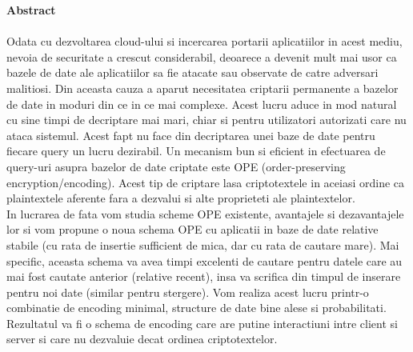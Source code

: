 \documentclass{article}
\newcommand\tab[1][1cm]{\hspace*{#1}}
\begin{document}
	\textbf{Abstract}\\\\
	\tab Odata cu dezvoltarea cloud-ului si incercarea portarii aplicatiilor in acest mediu, nevoia de securitate a crescut considerabil, deoarece a devenit mult mai usor ca bazele de date ale aplicatiilor sa fie atacate sau observate de catre adversari malitiosi. Din aceasta cauza a aparut necesitatea criptarii permanente a bazelor de date in moduri din ce in ce mai complexe. Acest lucru aduce in mod natural cu sine timpi de decriptare mai mari, chiar si pentru utilizatori autorizati care nu ataca sistemul. Acest fapt nu face din decriptarea unei baze de date pentru fiecare query un lucru dezirabil. Un mecanism bun si eficient in efectuarea de query-uri asupra bazelor de date criptate este OPE (order-preserving encryption/encoding). Acest tip de criptare lasa criptotextele in aceiasi ordine ca plaintextele aferente fara a dezvalui si alte proprieteti ale plaintextelor.\\
	\tab In lucrarea de fata vom studia scheme OPE existente, avantajele si dezavantajele lor si vom propune o noua schema OPE cu aplicatii in baze de date relative stabile (cu rata de insertie sufficient de mica, dar cu rata de cautare mare). Mai specific, aceasta schema va avea timpi excelenti de cautare pentru datele care au mai fost cautate anterior (relative recent), insa va scrifica din timpul de inserare pentru noi date (similar pentru stergere). Vom realiza acest lucru printr-o combinatie de encoding minimal, structure de date bine alese si probabilitati. Rezultatul va fi o schema de encoding care are putine interactiuni intre client si server si care nu dezvaluie decat ordinea criptotextelor.
	
\end{document}
